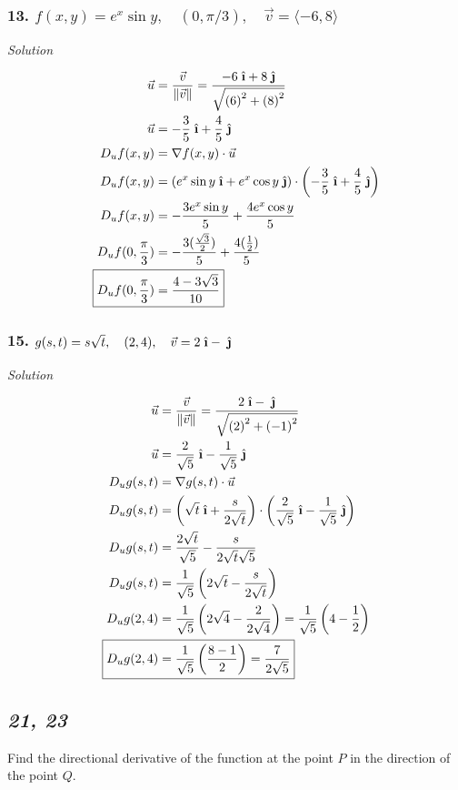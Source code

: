 \documentclass{article}
\newcommand{\ihat}{\;\hat{\textbf{\i}}}
\newcommand{\jhat}{\;\hat{\textbf{\j}}}
\newcommand\vv[1]{\langle #1 \rangle}
\newcommand\mgv[1]{\|#1\|}
\newcommand\mgvv[2]{\sqrt{\left(#1\right)^2 + \left(#2\right)^2}}
\newcommand{\solution}{\centerline{\textit{Solution}}}
\newcommand{\bp}[1]{\left(#1\right)}
\begin{document}
\subsubsection*{13. $f(x,y)=e^x\sin y,\quad (0,\pi /3),\quad \vec v = \vv{-6, 8}$}
\solution 
\begin{align*}
    \vec u &= \displaystyle\frac{\vec v}{\mgv{\vec v}} = \displaystyle\frac{-6\ihat+8\jhat}{\mgvv{6}{8}} \\
    \vec u &= -\frac {3}{5}\ihat + \frac 4 5\jhat \\
    D_u f(x,y) &= \nabla f(x,y) \cdot \vec u \\
    D_u f(x,y) &= \bp{e^x\sin y\ihat + e^x\cos y\jhat} \cdot \bp{-\frac 3 5\ihat
    + \frac 4 5 \jhat}\\
    D_u f(x,y) &= -\displaystyle\frac{3e^x\sin y}{5} +
    \displaystyle\frac{4e^x\cos y}{5}\\
    D_u f(0,\frac \pi 3) &= -\displaystyle\frac{3(\frac {\sqrt 3} 2)}{5} +
    \displaystyle\frac{4(\frac 1 2)}{5}\\
    \Aboxed{D_u f(0,\frac \pi 3) &= \displaystyle\frac{4-3\sqrt 3}{10}}\\
\end{align*}
\subsubsection*{15. $g(s,t)= s\sqrt t,\quad(2,4),\quad \vec v = 2\ihat - \jhat$}
\solution 
\begin{align*}
    \vec u &= \frac{\vec v}{\mgv{\vec v}} = \frac{2\ihat-\jhat}{\mgvv{2}{-1}} \\ 
    \vec u &= \frac 2 {\sqrt 5}\ihat - \frac 1 {\sqrt 5}\jhat \\
    D_u g(s,t) &= \nabla g(s,t) \cdot \vec u \\
    D_u g(s,t) &= \bp{\sqrt t\ihat + \frac{s}{2\sqrt t}}\cdot\bp{\frac 2 {\sqrt 5}\ihat - \frac 1 {\sqrt 5}\jhat} \\
    D_u g(s,t) &= \displaystyle\frac{2\sqrt t}{\sqrt 5} -
    \displaystyle\frac{s}{2\sqrt t \sqrt 5} \\
    D_u g(s,t) &= \frac 1 {\sqrt 5} \bp{2\sqrt t - \frac s {2\sqrt t}} \\
    D_u g(2,4) &= \frac1 {\sqrt 5}\bp{2\sqrt 4 - \frac 2 {2\sqrt 4}} = \frac 1
    {\sqrt 5}\bp{4 - \frac 1 2} \\
    \Aboxed{D_u g(2,4) &= \frac 1 {\sqrt 5} \bp{\frac {8-1}{2}} = \frac 7 {2\sqrt 5}}
\end{align*}
\newpage
\begin{center}
    \subsection*{\textit{21, 23}} 
    Find the directional derivative of the function at the point $P$ in the
    direction of the point $Q$.
\end{center}
\end{document}
